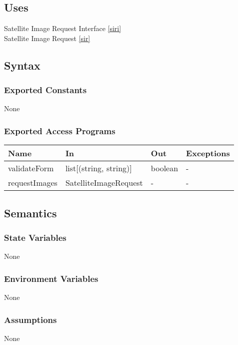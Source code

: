 \documentclass[12pt, titlepage]{article}
\begin{document}
\subsection{Uses}

Satellite Image Request Interface \ref{siri}\\
Satellite Image Request \ref{sir} \\

\subsection{Syntax}

\subsubsection{Exported Constants}
None
\subsubsection{Exported Access Programs}

\begin{center}
\begin{tabular}{p{4cm} p{4cm} p{4cm} p{2cm}}
\hline
\textbf{Name} & \textbf{In} & \textbf{Out} & \textbf{Exceptions} \\
\hline
validateForm & list[(string, string)] & boolean & - \\
requestImages & SatelliteImageRequest & - & - \\
\hline
\end{tabular}
\end{center}

\subsection{Semantics}

\subsubsection{State Variables}
None

\subsubsection{Environment Variables}
None

\subsubsection{Assumptions}
None
\end{document}
